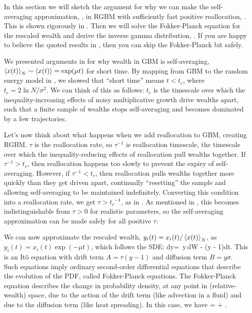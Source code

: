 In this section we will sketch the argument for why we can make the self-averaging approximation, , in RGBM with sufficiently fast positive reallocation, . This is shown rigorously in \cite{Bouchaud2015b}. Then we will solve the Fokker-Planck equation for the rescaled wealth and derive the inverse gamma distribution, . If you are happy to believe the quoted results in , then you can skip the Fokker-Planck bit safely.

We presented arguments in  for why wealth in GBM is self-averaging, $\left\langle x(t) \right\rangle_N\sim\left\langle x(t) \right\rangle=\exp(\mu t)$ for short time. By mapping from GBM to the random energy model in , we showed that ``short time'' means $t<t_c$, where $t_c=2\ln N/\sigma^2$. We can think of this as follows: $t_c$ is the timescale over which the inequality-increasing effects of noisy multiplicative growth drive wealths apart, such that a finite sample of wealths stops self-averaging and becomes dominated by a few trajectories.

Let's now think about what happens when we add reallocation to GBM, creating RGBM. $\tau$ is the reallocation rate, so $\tau^{-1}$ is reallocation timescale, \ie the timescale over which the inequality-reducing effects of reallocation pull wealths together. If $\tau^{-1}>t_c$, then reallocation happens too slowly to prevent the expiry of self-averaging. However, if $\tau^{-1}<t_c$, then reallocation pulls wealths together more quickly than they get driven apart, continually ``resetting'' the sample and allowing self-averaging to be maintained indefinitely. Converting this condition into a reallocation rate, we get $\tau>{t_c}^{-1}$, as in . As mentioned in , this becomes indistinguishable from $\tau>0$ for realistic parameters, so the self-averaging approximation can be made safely for all positive $\tau$.

We can now approximate the rescaled wealth, $y_i(t)=x_i(t)/\left\langle x(t) \right\rangle_N$, as $y_i(t)=x_i(t)\exp(-\mu t)$, which follows the SDE: 
\be
dy= \sigma\,y\,dW - \tau\left(y - 1\right)dt.
\ee
This is an It\^o equation with drift term $A=\tau(y - 1)$ and diffusion term $B=y \sigma$. Such equations imply ordinary second-order differential equations that describe the evolution of the PDF, called Fokker-Planck equations. The Fokker-Planck equation describes the change in probability density, at any point in (relative-wealth) space, due to the action of the drift term (like advection in a fluid) and due to the diffusion term (like heat spreading). In this case, we have
\be
{}= + .
\ee

